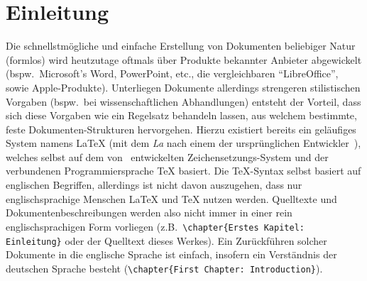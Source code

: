 \section{Einleitung}
Die schnellstmögliche und einfache Erstellung von Dokumenten beliebiger Natur (formlos) wird heutzutage oftmals über Produkte bekannter Anbieter abgewickelt (bspw.\ Microsoft's Word, PowerPoint, etc., die vergleichbaren \enquote{LibreOffice}, sowie Apple-Produkte).
Unterliegen Dokumente allerdings strengeren stilistischen Vorgaben (bspw.\ bei wissenschaftlichen Abhandlungen) entsteht der Vorteil, dass sich diese Vorgaben wie ein Regelsatz behandeln lassen, aus welchem bestimmte, feste Dokumenten-Strukturen hervorgehen. Hierzu existiert bereits ein geläufiges System namens \LaTeX{} (mit dem \textit{La} nach einem der ursprünglichen Entwickler~\cite{latexCompanion:leslieLamport}), welches selbst auf dem von~\cite{texbook} entwickelten Zeichensetzungs-System und der verbundenen Programmiersprache \TeX{} basiert.
Die \TeX{}-Syntax selbst basiert auf englischen Begriffen, allerdings ist nicht davon auszugehen, dass nur englischsprachige Menschen \LaTeX{} und \TeX{} nutzen werden. Quelltexte und Dokumentenbeschreibungen werden also nicht immer in einer rein englischsprachigen Form vorliegen (z.B.\ \verb|\chapter{Erstes Kapitel: Einleitung}| oder der Quelltext dieses Werkes). 
Ein Zurückführen solcher Dokumente in die englische Sprache ist einfach, insofern ein Verständnis der deutschen Sprache besteht (\verb|\chapter{First Chapter: Introduction}|). 
